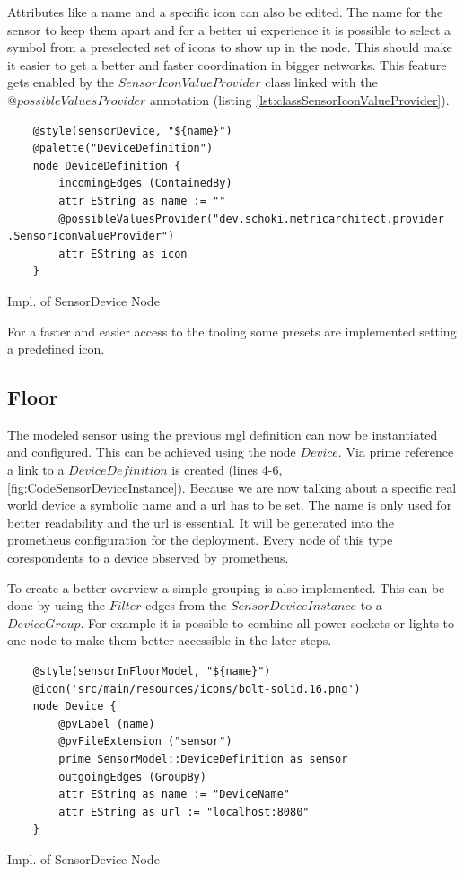 Attributes like a name and a specific icon  can also be edited. The name for the sensor to keep them apart and for a better \gls{ui} experience it is possible to select a symbol from a preselected set of icons to show up in the node. This should make it easier to get a better and faster coordination in bigger networks. This feature gets enabled by the $SensorIconValueProvider$ class linked with the $@possibleValuesProvider$ annotation (listing \ref{lst:classSensorIconValueProvider}).
\begin{listing}[H]
	\begin{verbatim}
	@style(sensorDevice, "${name}")
	@palette("DeviceDefinition")
	node DeviceDefinition {
		incomingEdges (ContainedBy)
		attr EString as name := ""
		@possibleValuesProvider("dev.schoki.metricarchitect.provider .SensorIconValueProvider")
		attr EString as icon
	}	
	\end{verbatim}
	\caption{Impl. of SensorDevice Node}
	\label{fig:CodeSensorDevice}
\end{listing}
For a faster and easier access to the tooling some presets are implemented setting a predefined icon.
\subsection{Floor}
The modeled sensor using the previous \gls{mgl} definition can now be instantiated and configured. This can be achieved using the node $Device$. Via prime reference a link to a $DeviceDefinition$ is created (lines 4-6, \ref{fig:CodeSensorDeviceInstance}). Because we are now talking about a specific real world device a symbolic name and a \gls{url} has to be set. The name is only used for better readability and the \gls{url} is essential. It will be generated into the prometheus configuration for the deployment. Every node of this type corespondents to a device observed by prometheus. 

To create a better overview a simple grouping is also implemented. This can be done by using the $Filter$ edges from the $SensorDeviceInstance$ to a $DeviceGroup$. For example it is possible to combine all power sockets or lights to one node to make them better accessible in the later steps. 

\begin{listing}[H]
	\begin{verbatim}
	@style(sensorInFloorModel, "${name}")
	@icon('src/main/resources/icons/bolt-solid.16.png')
	node Device {
		@pvLabel (name)
		@pvFileExtension ("sensor")
		prime SensorModel::DeviceDefinition as sensor
		outgoingEdges (GroupBy)
		attr EString as name := "DeviceName"
		attr EString as url := "localhost:8080"
	}	
	\end{verbatim}
	\caption{Impl. of SensorDevice Node}
	\label{fig:CodeSensorDeviceInstance}
\end{listing}

